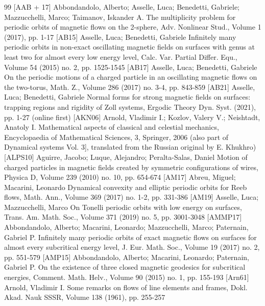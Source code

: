 \documentclass[10pt]{amsart}
\theoremstyle{definition}
\begin{document}
\begin{thebibliography}{99}
 [AAB + 17] Abbondandolo, Alberto; Asselle, Luca; Benedetti, Gabriele; Mazzucchelli, Marco; Taimanov, Iskander A. The multiplicity problem for periodic orbits of magnetic flows on the 2-sphere, Adv. Nonlinear Stud., Volume 1 (2017), pp. 1-17
 [AB15] Asselle, Luca; Benedetti, Gabriele Infinitely many periodic orbits in non-exact oscillating magnetic fields on surfaces with genus at least two for almost every low energy level, Calc. Var. Partial Differ. Equ., Volume 54 (2015) no. 2, pp. 1525-1545
 [AB17] Asselle, Luca; Benedetti, Gabriele On the periodic motions of a charged particle in an oscillating magnetic flows on the two-torus, Math. Z., Volume 286 (2017) no. 3-4, pp. 843-859
 [AB21] Asselle, Luca; Benedetti, Gabriele Normal forms for strong magnetic fields on surfaces: trapping regions and rigidity of Zoll systems, Ergodic Theory Dyn. Syst. (2021), pp. 1-27 (online first)
 [AKN06] Arnold, Vladimir I.; Kozlov, Valery V.; Neishtadt, Anatoly I. Mathematical aspects of classical and celestial mechanics, Encyclopaedia of Mathematical Sciences, 3, Springer, 2006 (also part of Dynamical systems Vol. 3], translated from the Russian original by E. Khukhro)
 [ALPS10] Aguirre, Jacobo; Luque, Alejandro; Peralta-Salas, Daniel Motion of charged particles in magnetic fields created by symmetric configurations of wires, Physica D, Volume 239 (2010) no. 10, pp. 654-674
 [AM17] Abreu, Miguel; Macarini, Leonardo Dynamical convexity and elliptic periodic orbits for Reeb flows, Math. Ann., Volume 369 (2017) no. 1-2, pp. 331-386
 [AM19] Asselle, Luca; Mazzucchelli, Marco On Tonelli periodic orbits with low energy on surfaces, Trans. Am. Math. Soc., Volume 371 (2019) no. 5, pp. 3001-3048
 [AMMP17] Abbondandolo, Alberto; Macarini, Leonardo; Mazzucchelli, Marco; Paternain, Gabriel P. Infinitely many periodic orbits of exact magnetic flows on surfaces for almost every subcritical energy level, J. Eur. Math. Soc., Volume 19 (2017) no. 2, pp. 551-579
 [AMP15] Abbondandolo, Alberto; Macarini, Leonardo; Paternain, Gabriel P. On the existence of three closed magnetic geodesics for subcritical energies, Comment. Math. Helv., Volume 90 (2015) no. 1, pp. 155-193
 [Arn61] Arnold, Vladimir I. Some remarks on flows of line elements and frames, Dokl. Akad. Nauk SSSR, Volume 138 (1961), pp. 255-257

\end{thebibliography}
\end{document}
